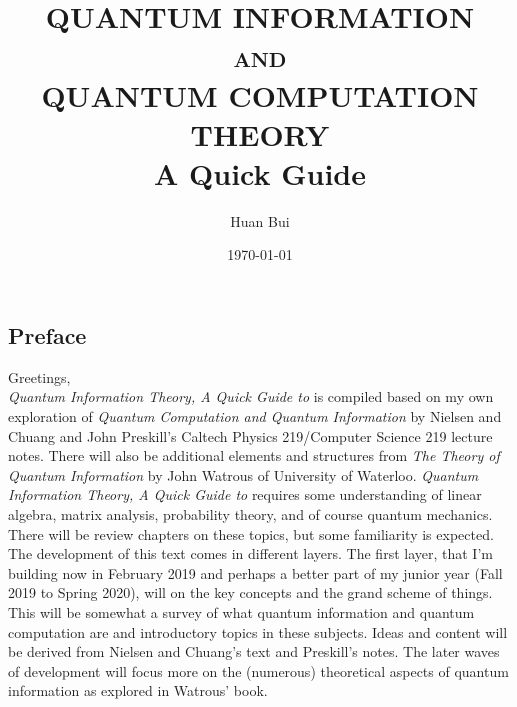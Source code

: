 \documentclass{article}
\theoremstyle{definition}
\begin{document}
	\begin{titlepage}\centering
		\clearpage
		\title{\textsc{\bf{QUANTUM INFORMATION\\
			and\\
		QUANTUM COMPUTATION THEORY}}\\\smallskip A Quick Guide\\}
		\author{\bigskip Huan Bui}
		\date{\today}
		\maketitle
		\thispagestyle{empty}
	\end{titlepage}

\newpage

\subsection*{Preface}

Greetings,\\

\textit{Quantum Information Theory, A Quick Guide to} is compiled based on my own exploration of \textit{Quantum Computation and Quantum Information} by Nielsen and Chuang and John Preskill's Caltech Physics 219/Computer Science 219 lecture notes. There will also be additional elements and structures from \textit{The Theory of Quantum Information} by John Watrous of University of Waterloo. \textit{Quantum Information Theory, A Quick Guide to} requires some understanding of linear algebra, matrix analysis, probability theory, and of course quantum mechanics. There will be review chapters on these topics, but some familiarity is expected.  \\

The development of this text comes in different layers. The first layer, that I'm building now in February 2019 and perhaps a better part of my junior year (Fall 2019 to Spring 2020), will on the key concepts and the grand scheme of things. This will be somewhat a survey of what quantum information and quantum computation are and introductory topics in these subjects. Ideas and content will be derived from Nielsen and Chuang's text and Preskill's notes. The later waves of development will focus more on the (numerous) theoretical aspects of quantum information as explored in Watrous' book. \\
\end{document}
